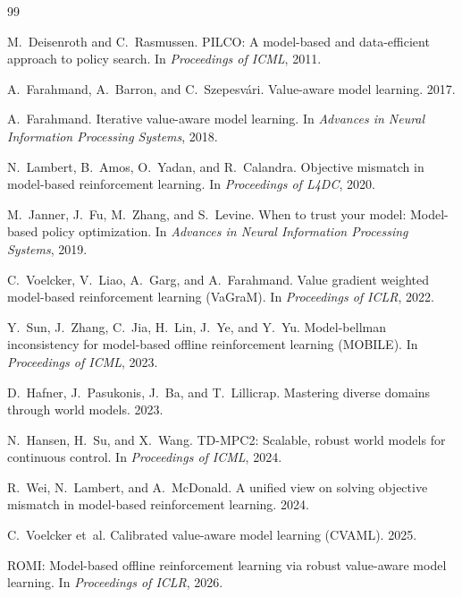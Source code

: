 \documentclass[11pt]{article}
\begin{document}
\begin{thebibliography}{99}

M.~Deisenroth and C.~Rasmussen.
PILCO: A model-based and data-efficient approach to policy search.
In \emph{Proceedings of ICML}, 2011.

A.~Farahmand, A.~Barron, and C.~Szepesv\'ari.
Value-aware model learning.
2017.

A.~Farahmand.
Iterative value-aware model learning.
In \emph{Advances in Neural Information Processing Systems}, 2018.

N.~Lambert, B.~Amos, O.~Yadan, and R.~Calandra.
Objective mismatch in model-based reinforcement learning.
In \emph{Proceedings of L4DC}, 2020.

M.~Janner, J.~Fu, M.~Zhang, and S.~Levine.
When to trust your model: Model-based policy optimization.
In \emph{Advances in Neural Information Processing Systems}, 2019.

C.~Voelcker, V.~Liao, A.~Garg, and A.~Farahmand.
Value gradient weighted model-based reinforcement learning (VaGraM).
In \emph{Proceedings of ICLR}, 2022.

Y.~Sun, J.~Zhang, C.~Jia, H.~Lin, J.~Ye, and Y.~Yu.
Model-bellman inconsistency for model-based offline reinforcement learning (MOBILE).
In \emph{Proceedings of ICML}, 2023.

D.~Hafner, J.~Pasukonis, J.~Ba, and T.~Lillicrap.
Mastering diverse domains through world models.
2023.

N.~Hansen, H.~Su, and X.~Wang.
TD-MPC2: Scalable, robust world models for continuous control.
In \emph{Proceedings of ICML}, 2024.

R.~Wei, N.~Lambert, and A.~McDonald.
A unified view on solving objective mismatch in model-based reinforcement learning.
2024.

C.~Voelcker et~al.
Calibrated value-aware model learning (CVAML).
2025.

ROMI: Model-based offline reinforcement learning via robust value-aware model learning.
In \emph{Proceedings of ICLR}, 2026.

\end{thebibliography}
\end{document}
